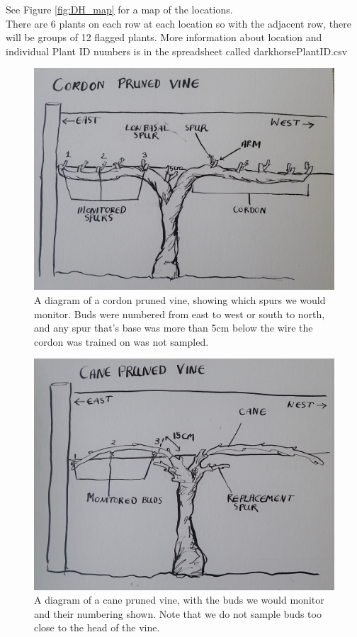 \documentclass[11pt,letter]{article}
\begin{document}
See Figure \ref{fig:DH_map} for a map of the locations. \\

There are 6 plants on each row at each location so with the adjacent row, there will be groups of 12 flagged plants. More information about location and individual Plant ID numbers is in the spreadsheet called darkhorsePlantID.csv


\begin{figure}%
  \includegraphics[width=\linewidth]{CordonPruned.jpg}
  \caption{A diagram of a cordon pruned vine, showing which spurs we would monitor. Buds were numbered from east to west or south to north, and any spur that's base was more than 5cm below the wire the cordon was trained on was not sampled.}
  \label{fig:CordonPruned}
\end{figure}

\begin{figure}%
  \includegraphics[width=\linewidth]{CanePruned.jpg}
  \caption{A diagram of a cane pruned vine, with the buds we would monitor and their numbering shown. Note that we do not sample buds too close to the head of the vine.}
  \label{fig:CanePruned}
\end{figure}
\end{document}
